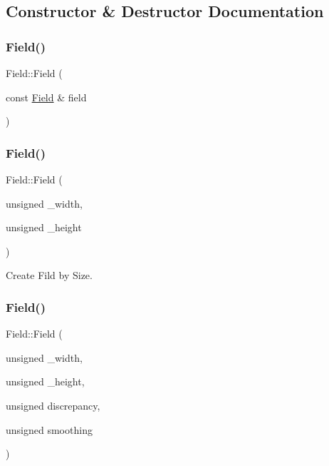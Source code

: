 \subsection{Constructor \& Destructor Documentation}
\mbox{\label{classField_a72ebbf8a9843cfd7844aa76698ea1541}} 
\subsubsection{\texorpdfstring{Field()}{Field()}\hspace{0.1cm}{\footnotesize\ttfamily [1/3]}}
{\footnotesize\ttfamily Field\+::\+Field (\begin{DoxyParamCaption}\item[{const \hyperlink{classField}{Field} \&}]{field }\end{DoxyParamCaption})\hspace{0.3cm}{\ttfamily [private]}}

\mbox{\label{classField_ace906b0a3a8057fd29feb3208738da8b}} 
\subsubsection{\texorpdfstring{Field()}{Field()}\hspace{0.1cm}{\footnotesize\ttfamily [2/3]}}
{\footnotesize\ttfamily Field\+::\+Field (\begin{DoxyParamCaption}\item[{unsigned}]{\+\_\+width,  }\item[{unsigned}]{\+\_\+height }\end{DoxyParamCaption})}

Create Fild by Size. \mbox{\label{classField_a8f32e3182de753297bf48cbf81266fa0}} 
\subsubsection{\texorpdfstring{Field()}{Field()}\hspace{0.1cm}{\footnotesize\ttfamily [3/3]}}
{\footnotesize\ttfamily Field\+::\+Field (\begin{DoxyParamCaption}\item[{unsigned}]{\+\_\+width,  }\item[{unsigned}]{\+\_\+height,  }\item[{unsigned}]{discrepancy,  }\item[{unsigned}]{smoothing }\end{DoxyParamCaption})}

